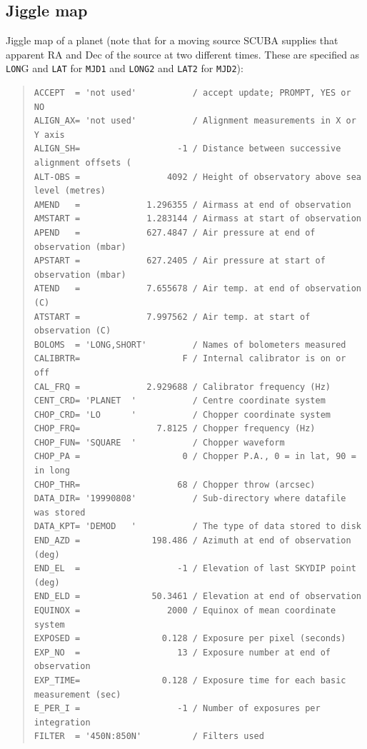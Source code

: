 \documentclass[twoside,11pt]{article}
\newenvironment{myquote}{\begin{quote}\begin{small}}{\end{small}\end{quote}}
\renewcommand{\_}{\texttt{\symbol{95}}}
\begin{document}
\subsection{Jiggle map}

Jiggle map of a planet (note that for a moving source SCUBA supplies that
apparent RA and Dec of the source at two different times. These are specified
as \texttt{LON}G and \texttt{LAT} for \texttt{MJD1} and \texttt{LONG2} and
\texttt{LAT2} for \texttt{MJD2}):

\begin{myquote}
\begin{verbatim}
ACCEPT  = 'not used'           / accept update; PROMPT, YES or NO
ALIGN_AX= 'not used'           / Alignment measurements in X or Y axis
ALIGN_SH=                   -1 / Distance between successive alignment offsets (
ALT-OBS =                 4092 / Height of observatory above sea level (metres)
AMEND   =             1.296355 / Airmass at end of observation
AMSTART =             1.283144 / Airmass at start of observation
APEND   =             627.4847 / Air pressure at end of observation (mbar)
APSTART =             627.2405 / Air pressure at start of observation (mbar)
ATEND   =             7.655678 / Air temp. at end of observation (C)
ATSTART =             7.997562 / Air temp. at start of observation (C)
BOLOMS  = 'LONG,SHORT'         / Names of bolometers measured
CALIBRTR=                    F / Internal calibrator is on or off
CAL_FRQ =             2.929688 / Calibrator frequency (Hz)
CENT_CRD= 'PLANET  '           / Centre coordinate system
CHOP_CRD= 'LO      '           / Chopper coordinate system
CHOP_FRQ=               7.8125 / Chopper frequency (Hz)
CHOP_FUN= 'SQUARE  '           / Chopper waveform
CHOP_PA =                    0 / Chopper P.A., 0 = in lat, 90 = in long
CHOP_THR=                   68 / Chopper throw (arcsec)
DATA_DIR= '19990808'           / Sub-directory where datafile was stored
DATA_KPT= 'DEMOD   '           / The type of data stored to disk
END_AZD =              198.486 / Azimuth at end of observation (deg)
END_EL  =                   -1 / Elevation of last SKYDIP point (deg)
END_ELD =              50.3461 / Elevation at end of observation
EQUINOX =                 2000 / Equinox of mean coordinate system
EXPOSED =                0.128 / Exposure per pixel (seconds)
EXP_NO  =                   13 / Exposure number at end of observation
EXP_TIME=                0.128 / Exposure time for each basic measurement (sec)
E_PER_I =                   -1 / Number of exposures per integration
FILTER  = '450N:850N'          / Filters used

\end{verbatim}
\end{myquote}
\end{document}
